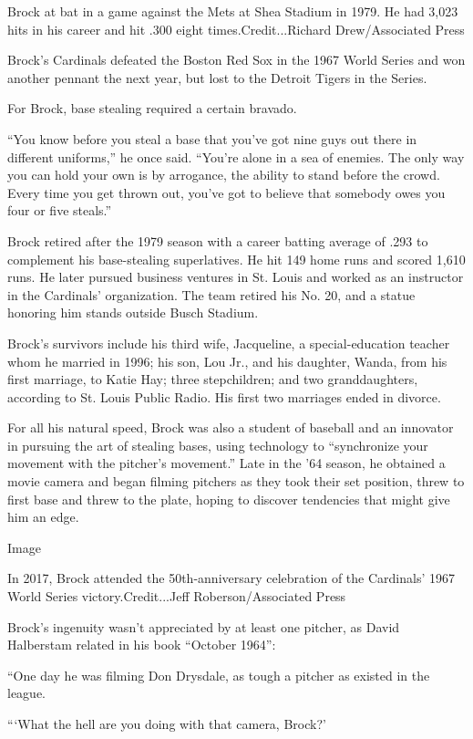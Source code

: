 Brock at bat in a game against the Mets at Shea Stadium in 1979. He had
3,023 hits in his career and hit .300 eight times.Credit...Richard
Drew/Associated Press

Brock's Cardinals defeated the Boston Red Sox in the 1967 World Series
and won another pennant the next year, but lost to the Detroit Tigers in
the Series.

For Brock, base stealing required a certain bravado.

``You know before you steal a base that you've got nine guys out there
in different uniforms,'' he once said. ``You're alone in a sea of
enemies. The only way you can hold your own is by arrogance, the ability
to stand before the crowd. Every time you get thrown out, you've got to
believe that somebody owes you four or five steals.''

Brock retired after the 1979 season with a career batting average of
.293 to complement his base-stealing superlatives. He hit 149 home runs
and scored 1,610 runs. He later pursued business ventures in St. Louis
and worked as an instructor in the Cardinals' organization. The team
retired his No. 20, and a statue honoring him stands outside Busch
Stadium.

Brock's survivors include his third wife, Jacqueline, a
special-education teacher whom he married in 1996; his son, Lou Jr., and
his daughter, Wanda, from his first marriage, to Katie Hay; three
stepchildren; and two granddaughters, according to St. Louis Public
Radio. His first two marriages ended in divorce.

For all his natural speed, Brock was also a student of baseball and an
innovator in pursuing the art of stealing bases, using technology to
``synchronize your movement with the pitcher's movement.'' Late in the
'64 season, he obtained a movie camera and began filming pitchers as
they took their set position, threw to first base and threw to the
plate, hoping to discover tendencies that might give him an edge.

Image

In 2017, Brock attended the 50th-anniversary celebration of the
Cardinals' 1967 World Series victory.Credit...Jeff Roberson/Associated
Press

Brock's ingenuity wasn't appreciated by at least one pitcher, as David
Halberstam related in his book ``October 1964'':

``One day he was filming Don Drysdale, as tough a pitcher as existed in
the league.

```What the hell are you doing with that camera, Brock?'

